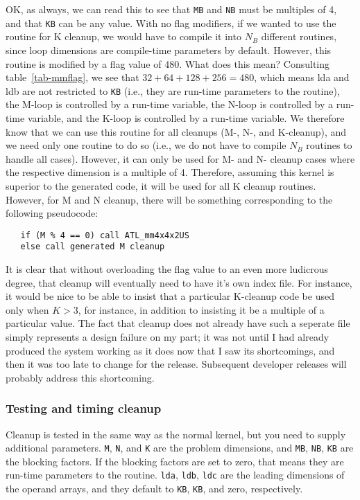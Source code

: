 \documentclass[11pt]{article}
\begin{document}
OK, as always, we can read this to see that {\tt MB} and {\tt NB}
must be multiples of 4, and that {\tt KB} can be any value.  With
no flag modifiers, if we wanted to use the routine for K cleanup,
we would have to compile it into $N_B$ different routines, since
loop dimensions are compile-time parameters by default.  However,
this routine is modified by a flag value of 480.  What does this mean?
Consulting table~\ref{tab-mmflag}, we see that $32 + 64 + 128 + 256 = 480$,
which means lda and ldb are not restricted to {\tt KB} (i.e., they are
run-time parameters to the routine), the M-loop is controlled by a run-time
variable, the N-loop is controlled by a run-time variable, and the K-loop
is controlled by a run-time variable.  We therefore know that we can
use this routine for all cleanups (M-, N-, and K-cleanup), and we need only
one routine to do so (i.e., we do not have to compile $N_B$ routines to handle
all cases).  However, it can only be used for M- and N- cleanup cases where
the respective dimension is a multiple of 4.  Therefore, assuming this
kernel is superior to the generated code, it will be used for all K cleanup
routines.  However, for M and N cleanup, there will be something corresponding
to the following pseudocode:
\begin{verbatim}
   if (M % 4 == 0) call ATL_mm4x4x2US
   else call generated M cleanup
\end{verbatim}


It is clear that without overloading the flag value to an even more
ludicrous degree, that cleanup will eventually need to have it's own
index file.  For instance, it would be nice to be able to insist that
a particular K-cleanup code be used only when $K > 3$, for instance,
in addition to insisting it be a multiple of a particular value.  The fact
that cleanup does not already have such a seperate file simply represents
a design failure on my part; it was not until I had already produced the
system working as it does now that I saw its shortcomings, and then it
was too late to change for the release.  Subsequent developer releases
will probably address this shortcoming.

\subsubsection{Testing and timing cleanup}
Cleanup is tested in the same way as the normal kernel, but you need to
supply additional parameters.  {\tt M}, {\tt N}, and {\tt K} are the problem
dimensions, and {\tt MB}, {\tt NB}, {\tt KB} are the blocking factors.
If the blocking factors are set to zero, that means they are run-time
parameters to the routine.  {\tt lda}, {\tt ldb}, {\tt ldc} are the leading
dimensions of the operand arrays, and they default to {\tt KB}, {\tt KB},
and zero, respectively.
\end{document}

